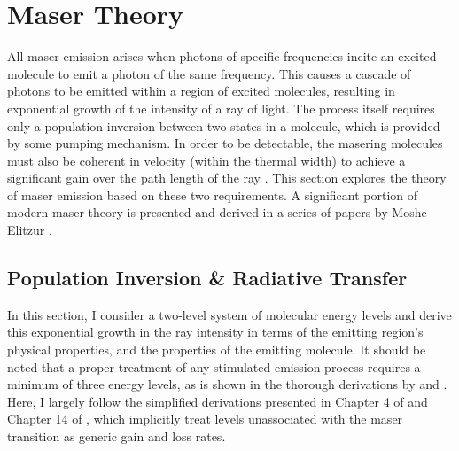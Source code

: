 \section{Maser Theory}
\label{sec:maser_theory}

All maser emission arises when photons of specific frequencies incite an excited molecule to emit a photon of the same frequency.  This causes a cascade of photons to be emitted within a region of excited molecules, resulting in exponential growth of the intensity of a ray of light.  The process itself requires only a population inversion between two states in a molecule, which is provided by some pumping mechanism.  In order to be detectable, the masering molecules must also be coherent in velocity (within the thermal width) to achieve a significant gain over the path length of the ray \citep{lo2005}.  This section explores the theory of maser emission based on these two requirements.  A significant portion of modern maser theory is presented and derived in a series of papers by Moshe Elitzur \citep{Elitzur_1990,Elitzur_1990_paperI,Elitzur_1990_paperII,Elitzur_1991}.

\subsection{Population Inversion \& Radiative Transfer}
\label{sub:pop_inverse_rad_trans}

In this section, I consider a two-level system of molecular energy levels and derive this exponential growth in the ray intensity in terms of the emitting region's physical properties, and the properties of the emitting molecule. It should be noted that a proper treatment of any stimulated emission process requires a minimum of three energy levels, as is shown in the thorough derivations by \cite{Elitzur_1992} and \cite{Gray_2009}. Here, I largely follow the simplified derivations presented in Chapter 4 of \citet{Elitzur_1992} and Chapter 14 of \citet{stahler_palla_2004}, which implicitly treat levels unassociated with the maser transition as generic gain and loss rates.

